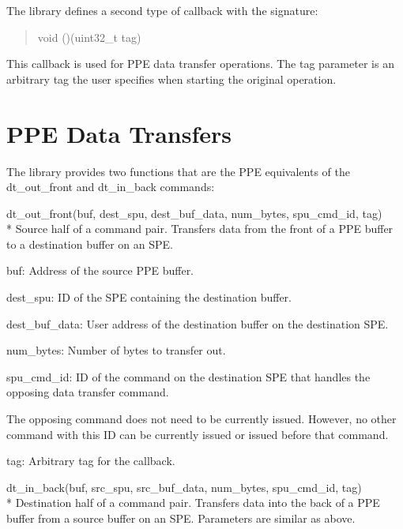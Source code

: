 The library defines a second type of callback with the signature:
\begin{quote}
\textsf{void ()(uint32\_t tag)}
\end{quote}
This callback is used for PPE data transfer operations. The \textsf{tag} parameter is an arbitrary tag the user specifies when starting the original operation.

\section{PPE Data Transfers}\label{app:ui:dt}

The library provides two functions that are the PPE equivalents of the \textsf{dt\_out\_front} and \textsf{dt\_in\_back} commands:
\begin{description}
\item \textsf{dt\_out\_front(buf, dest\_spu, dest\_buf\_data, num\_bytes, spu\_cmd\_id, tag)} \\*
Source half of a command pair. Transfers data from the front of a PPE buffer to a destination buffer on an SPE.
\begin{description}
\item \textsf{buf}: Address of the source PPE buffer.
\item \textsf{dest\_spu}: ID of the SPE containing the destination buffer.
\item \textsf{dest\_buf\_data}: User address of the destination buffer on the destination SPE.
\item \textsf{num\_bytes}: Number of bytes to transfer out.
\item \textsf{spu\_cmd\_id}: ID of the command on the destination SPE that handles the opposing data transfer command.

The opposing command does not need to be currently issued. However, no other command with this ID can be currently issued or issued before that command.
\item \textsf{tag}: Arbitrary tag for the callback.
\end{description}

\item \textsf{dt\_in\_back(buf, src\_spu, src\_buf\_data, num\_bytes, spu\_cmd\_id, tag)} \\*
Destination half of a command pair. Transfers data into the back of a PPE buffer from a source buffer on an SPE. Parameters are similar as above.

\end{description}

